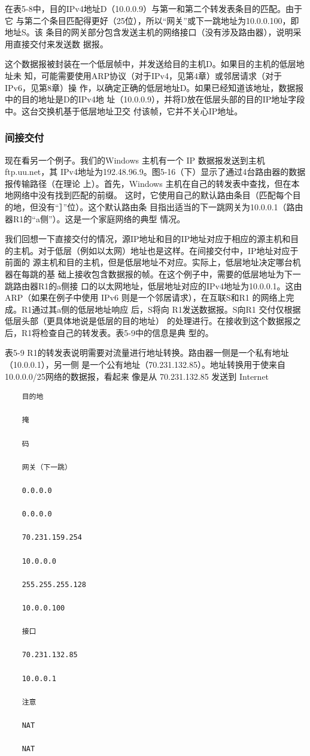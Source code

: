 在表5-8中，目的IPv4地址D（10.0.0.9）与第一和第二个转发表条目的匹配。由于它
与第二个条目匹配得更好（25位），所以“网关”或下一跳地址为10.0.0.100，即地址S。该
条目的网关部分包含发送主机的网络接口（没有涉及路由器），说明采用直接交付来发送数
据报。

这个数据报被封装在一个低层帧中，并发送给目的主机D。如果目的主机的低层地址未
知，可能需要使用ARP协议（对于IPv4，见第4章）或邻居请求（对于 IPv6，见第8章）操
作，以确定正确的低层地址D。如果已经知道该地址，数据报中的目的地址是D的IPv4地
址（10.0.0.9），并将D放在低层头部的目的IP地址字段中。这台交换机基于低层地址卫交
付该帧，它并不关心IP地址。

\subsubsection{间接交付}
现在看另一个例子。我们的Windows 主机有一个 IP 数据报发送到主机 ftp.uu.net，其
IPv4地址为192.48.96.9。图5-16（下）显示了通过4台路由器的数据报传输路径（在理论
上）。首先，Windows 主机在自己的转发表中查找，但在本地网络中没有找到匹配的前缀。
这时，它使用自己的默认路由条目（匹配每个目的地，但没有“］”位）。这个默认路由条
目指出适当的下一跳网关为10.0.0.1（路由器R1的“a侧”）。这是一个家庭网络的典型
情况。

我们回想一下直接交付的情况，源IP地址和目的IP地址对应于相应的源主机和目
的主机。对于低层（例如以太网）地址也是这样。在间接交付中，IP地址对应于前面的
源主机和目的主机，但是低层地址不对应。实际上，低层地址决定哪台机器在每跳的基
础上接收包含数据报的帧。在这个例子中，需要的低层地址为下一跳路由器R1的a侧接
口的以太网地址，低层地址对应的IPv4地址为10.0.0.1。这由 ARP（如果在例子中使用
IPv6 则是一个邻居请求），在互联S和R1 的网络上完成。R1通过其a侧的低层地址响应
后，S将向 R1发送数据报。S向R1 交付仅根据低层头部（更具体地说是低层的目的地址）
的处理进行。在接收到这个数据报之后，R1将检查自己的转发表。表5-9中的信息是典
型的。

表5-9 R1的转发表说明需要对流量进行地址转换。路由器一侧是一个私有地址（10.0.0.1），另一侧
是一个公有地址（70.231.132.85）。地址转换用于使来自10.0.0.0/25网络的数据报，看起来
像是从 70.231.132.85 发送到 Internet

\begin{verbatim}
    目的地

    掩

    码

    网关（下一跳）

    0.0.0.0

    0.0.0.0

    70.231.159.254

    10.0.0.0

    255.255.255.128

    10.0.0.100

    接口

    70.231.132.85

    10.0.0.1

    注意

    NAT

    NAT
\end{verbatim}

